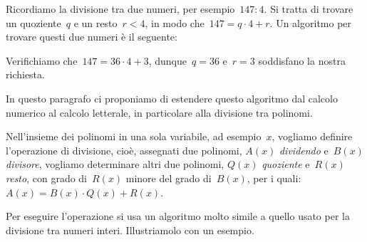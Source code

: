 Ricordiamo la divisione tra due numeri, per esempio~$147:4$. Si tratta di trovare un quoziente~$q$ e un resto~$r<4$, in modo 
che~$147=q\cdot 4+r$. Un algoritmo per trovare questi due numeri è il seguente:
\begin{center}
 
\end{center}
Verifichiamo che~$147=36\cdot 4+3$, dunque~$q=36$ e~$r=3$ soddisfano la nostra richiesta.

In questo paragrafo ci proponiamo di estendere questo algoritmo dal calcolo numerico al calcolo letterale, in particolare alla divisione tra polinomi.

Nell'insieme dei polinomi in una sola variabile, ad esempio~$x$, vogliamo definire l'operazione di divisione, cioè, assegnati
due polinomi, $A(x)$ \emph{dividendo} e~$B(x)$ \emph{divisore}, vogliamo determinare altri due polinomi, $Q(x)$ \emph{quoziente} e~$R(x)$ \emph{resto},
con grado di~$R(x)$ minore del grado di~$B(x)$, per i quali:~$A(x) = B(x){\cdot}Q(x) + R(x)$.

Per eseguire l'operazione si usa un algoritmo molto simile a quello usato per la divisione tra numeri interi. Illustriamolo con un esempio.

